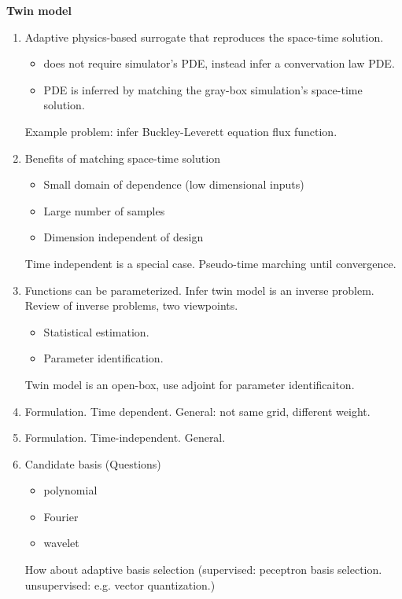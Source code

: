 \documentclass[a4paper,onecolumn]{article}
\theoremstyle{remark}
\begin{document}
\newpage
\textbf{Twin model}
\begin{enumerate}
    \item Adaptive physics-based surrogate that reproduces the space-time solution.
          \begin{itemize}
              \item does not require simulator's PDE, instead infer a convervation law PDE.
              \item PDE is inferred by matching the gray-box simulation's space-time solution.
          \end{itemize}
          Example problem: infer Buckley-Leverett equation flux function.
    \item Benefits of matching space-time solution
          \begin{itemize}
              \item Small domain of dependence (low dimensional inputs)
              \item Large number of samples
              \item Dimension independent of design
          \end{itemize}
          Time independent is a special case. Pseudo-time marching until convergence.
    \item Functions can be parameterized. Infer twin model is an inverse problem.\\
          Review of inverse problems, two viewpoints.
          \begin{itemize}
              \item Statistical estimation.
              \item Parameter identification.
          \end{itemize}
          Twin model is an open-box, use adjoint for parameter identificaiton.
    \item Formulation. Time dependent. General: not same grid, different weight.
    \item Formulation. Time-independent. General.
    \item Candidate basis (Questions)
          \begin{itemize}
              \item polynomial
              \item Fourier
              \item wavelet
          \end{itemize}
          How about adaptive basis selection (supervised: peceptron basis selection. unsupervised: e.g. vector quantization.)

\end{enumerate}
\end{document}
